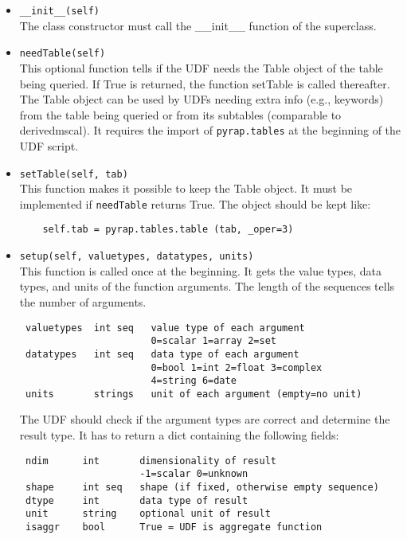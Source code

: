 \begin{itemize}
 \item \texttt{\_\_init\_\_(self)}\\
  The class constructor must call the \_\_init\_\_ function of the
  superclass.
 \item \texttt{needTable(self)}\\
  This optional function tells if the UDF needs the Table object of
  the table being queried.
  If True is returned, the function setTable is called thereafter.
  The Table object can be used by UDFs needing extra info
  (e.g., keywords) from the table being queried or from its subtables
  (comparable to derivedmscal). 
  It requires the import of \texttt{pyrap.tables} at the beginning of
  the UDF script.
 \item \texttt{setTable(self, tab)}\\
  This function makes it possible to keep the Table object. It must be
  implemented if \texttt{needTable} returns True.
  The object should be kept like:
\begin{verbatim}
    self.tab = pyrap.tables.table (tab, _oper=3)
\end{verbatim}
  
 \item \texttt{setup(self, valuetypes, datatypes, units)}\\
  This function is called once at the beginning. It gets the value
  types, data types, and units of the function arguments. The length of the
  sequences tells the number of arguments. 
\begin{verbatim}
 valuetypes  int seq   value type of each argument
                       0=scalar 1=array 2=set
 datatypes   int seq   data type of each argument
                       0=bool 1=int 2=float 3=complex
                       4=string 6=date
 units       strings   unit of each argument (empty=no unit)
\end{verbatim}
  The UDF should check if the argument types are correct and determine
  the result type.
  It has to return a dict containing the following fields:
\begin{verbatim}
 ndim      int       dimensionality of result
                     -1=scalar 0=unknown
 shape     int seq   shape (if fixed, otherwise empty sequence)
 dtype     int       data type of result
 unit      string    optional unit of result
 isaggr    bool      True = UDF is aggregate function
\end{verbatim}


\end{itemize}
